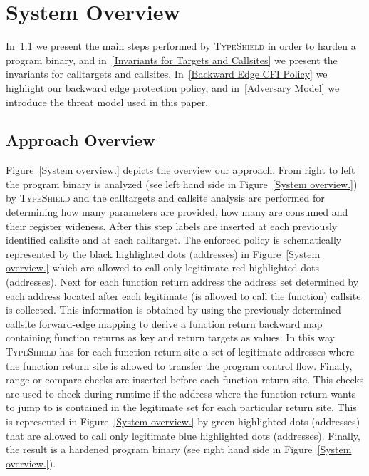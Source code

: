\section{System Overview}
\label{chapter:TypeShild Overview}
In~\cref{Overview} we present the main steps performed by \textsc{TypeShield} in order to harden a program binary, and
in~\cref{Invariants for Targets and Callsites} we present the invariants for calltargets and callsites.
In~\cref{Backward Edge CFI Policy} we highlight our backward edge protection policy, and
in~\cref{Adversary Model} we introduce the threat model used in this paper.
\subsection{Approach Overview}
\label{Overview}
Figure~\ref{System overview.} depicts the overview our approach.
From right to left the program binary is analyzed (see left hand side in Figure~\ref{System overview.}) by \textsc{TypeShield} and the calltargets
and callsite analysis are performed for determining 
how many parameters are provided, 
how many are consumed and their register wideness.
After this step labels are inserted at each previously identified callsite and at each calltarget. 
The enforced policy is schematically represented by the black highlighted dots (addresses) in Figure~\ref{System overview.} which are allowed to call only legitimate red highlighted dots (addresses).
Next for each function return address the address set determined by each address located after each legitimate (is allowed to call the function) callsite is collected.
This information is obtained by using the previously determined callsite forward-edge mapping to derive a function return backward map containing function returns as key and return targets as values.
In this way \textsc{TypeShield} has for each function return site a set of legitimate addresses where the function return site is allowed to transfer the program control flow.
Finally, range or compare checks are inserted before each function return site. This checks are used to check during runtime if the 
address where the function return wants to jump to is contained in the legitimate set for each particular return site.
This is represented in Figure~\ref{System overview.} by green highlighted dots (addresses) that are allowed to call only legitimate blue highlighted dots (addresses).
Finally, the result is a hardened program binary (see right hand side in Figure~\ref{System overview.}).



